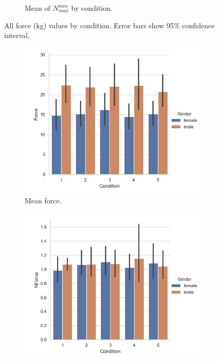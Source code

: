 \begin{figure}[H]
\begin{subfigure}[b]{0.4\textwidth}
         \caption{Mean of $N_{max}^{min}$ by condition.}
         \label{fig:meanN2Cond}
     \end{subfigure} 
      \caption{All force (kg) values by condition. Error bars show 95\%  confidence interval.}
         \label{fig:allForceCond}
\end{figure} 
 

\begin{figure}[H]
\hspace{-10mm}
     \begin{subfigure}[b]{0.3\textwidth}
         \centering
     \includegraphics[scale=0.4]{Files/Plots/force_mean_by_condition__gen.png}
         \caption{Mean force.}
     \label{fig:forceMeanCondGen}
     \end{subfigure}
     \hspace{7mm}
     \begin{subfigure}[b]{0.3\textwidth}
         \centering
     \includegraphics[scale=0.4]{Files/Plots/forceNforce_mean_by_condition_gen.png}

\end{subfigure}
\end{figure}
